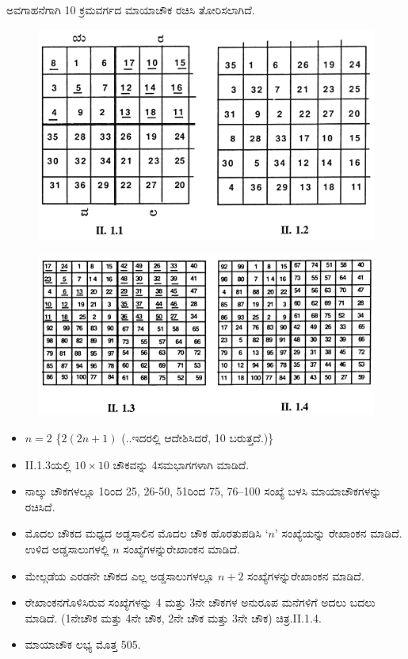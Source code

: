 ಅವಗಾಹನೆಗಾಗಿ 10 ಕ್ರಮವರ್ಗದ ಮಾಯಾಚೌಕ ರಚಿಸಿ ತೋರಿಸಲಾಗಿದೆ.
\begin{figure}[h]
\includegraphics[scale=.9]{src/figures/chap3/fig3.14.jpg}
\end{figure}
\begin{figure}[h]
\includegraphics[scale=1.05]{src/figures/chap3/fig3.15.jpg}
\end{figure}

\newpage

\begin{itemize}
	\item $n=2$ \{$2(2n+1)$ (..ಇದರಲ್ಲಿ ಆದೇಶಿಸಿದರೆ, 10 ಬರುತ್ತದೆ.)\}
	\item II.1.3ಯಲ್ಲಿ $10\times 10$ ಚೌಕವನ್ನು 4ಸಮಭಾಗಗಳಾಗಿ ಮಾಡಿದೆ.
	\item ನಾಲ್ಕು ಚೌಕಗಳಲ್ಲೂ 1ರಿಂದ 25, 26-50, 51ರಿಂದ 75, 76--100 ಸಂಖ್ಯೆ ಬಳಸಿ ಮಾಯಾಚೌಕಗಳನ್ನು ರಚಿಸಿದೆ.
	\item ಮೊದಲ ಚೌಕದ ಮಧ್ಯದ ಅಡ್ಡಸಾಲಿನ ಮೊದಲ ಚೌಕ ಹೊರತುಪಡಿಸಿ $‘n’$ ಸಂಖ್ಯೆಯನ್ನು ರೇಖಾಂಕನ ಮಾಡಿದೆ. ಉಳಿದ ಅಡ್ಡಸಾಲುಗಳಲ್ಲಿ $n$ ಸಂಖ್ಯೆಗಳನ್ನು\break ರೇಖಾಂಕನ ಮಾಡಿದೆ.
	\item ಮೇಲ್ಗಡೆಯ ಎರಡನೇ ಚೌಕದ ಎಲ್ಲ ಅಡ್ಡಸಾಲುಗಳಲ್ಲೂ $n+2$ ಸಂಖ್ಯೆಗಳನ್ನು\break ರೇಖಾಂಕನ ಮಾಡಿದೆ.
	\item ರೇಖಾಂಕನಗೊಳಿಸಿರುವ ಸಂಖ್ಯೆಗಳನ್ನು 4 ಮತ್ತು 3ನೇ ಚೌಕಗಳ ಅನುರೂಪ ಮನೆ\-ಗಳಿಗೆ ಅದಲು ಬದಲು ಮಾಡಿದೆ. (1ನೇಚೌಕ ಮತ್ತು 4ನೇ ಚೌಕ, 2ನೇ ಚೌಕ ಮತ್ತು 3ನೇ ಚೌಕ) ಚಿತ್ರ.II.1.4.
	\item ಮಾಯಾಚೌಕ ಲಭ್ಯ ಮೊತ್ತ 505.
\end{itemize}

